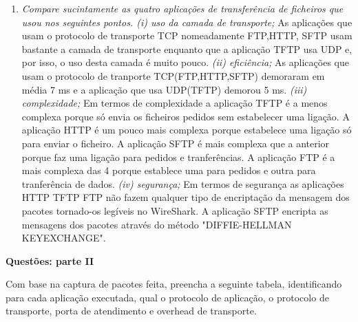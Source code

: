 \documentclass{article}
\begin{document}
\begin{enumerate}
    \item \textit{Compare sucintamente as quatro aplicações de transferência de ficheiros que usou nos seguintes pontos. \newline 
    (i) uso da camada de transporte;} \newline
    As aplicações que usam o protocolo de transporte TCP nomeadamente FTP,HTTP, SFTP usam bastante a camada de transporte enquanto que a aplicação TFTP usa UDP e, por isso, o uso desta camada é muito pouco. \newline \newline 
    \textit {(ii) eficiência;} \newline
    As aplicações que usam o protocolo de tranporte TCP(FTP,HTTP,SFTP) demoraram em média 7 ms e a aplicação que usa UDP(TFTP) demorou 5 ms. \newline \newline 
    \textit {(iii) complexidade;} \newline
    Em termos de complexidade a aplicação TFTP é a menos complexa porque só envia os ficheiros pedidos sem estabelecer uma ligação. A aplicação HTTP é um pouco mais complexa porque estabelece uma ligação só para enviar o ficheiro.
    A aplicação SFTP é mais complexa que a anterior porque faz uma ligação para pedidos e tranferências.  
    A aplicação FTP é a mais complexa das 4 porque establece uma para pedidos e outra para tranferência de dados. \newline \newline 
    \textit{(iv) segurança;}\newline
    Em termos de segurança as aplicações HTTP TFTP FTP não fazem
    qualquer tipo de encriptação da mensagem dos pacotes tornado-os legíveis no WireShark. A aplicação SFTP encripta as mensagens dos pacotes através do método "DIFFIE-HELLMAN KEYEXCHANGE". \newline
    

\end{enumerate}


\textbf{Questões: parte II}

\par

Com base na captura de pacotes feita, preencha a seguinte tabela, identificando para cada aplicação executada, qual o
protocolo de aplicação, o protocolo de transporte, porta de atendimento e overhead de transporte.
\end{document}

